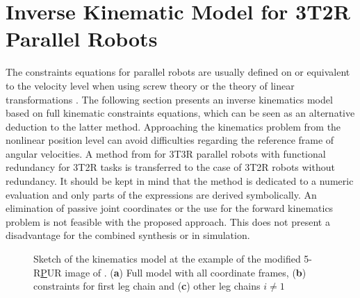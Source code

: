 \documentclass[
	graybox,
	vecphys] %
	{svmult}
\begin{document}
\vspace{-0.5cm}
\section{Inverse Kinematic Model for 3T2R Parallel Robots}
\label{sec:model}
\vspace{-0.2cm} %

The constraints equations for parallel robots are usually defined on or equivalent to the velocity level when using screw theory \cite{KongGos2007} or the theory of linear transformations \cite{Gogu2008}.
The following section presents an inverse kinematics model based on full kinematic constraints equations, which can be seen as an alternative deduction to the latter method.
Approaching the kinematics problem from the nonlinear position level can avoid difficulties regarding the reference frame of angular velocities.
A method from \cite{SchapplerTapOrt2019} for 3T3R parallel robots with functional redundancy for 3T2R tasks is transferred to the case of 3T2R robots without redundancy.
It should be kept in mind that the method is dedicated to a numeric evaluation and only parts of the expressions are derived symbolically.
An elimination of passive joint coordinates or the use for the forward kinematics problem is not feasible with the proposed approach.
This does not present a disadvantage for the combined synthesis or in simulation. 

\begin{figure}[tb]

\caption{Sketch of the kinematics model at the example of the modified 5-R\underline{P}UR image of \cite{MasoulehGos2011}. (\textbf{a}) Full model with all coordinate frames, (\textbf{b}) constraints for first leg chain and (\textbf{c}) other leg chains $i{\ne}1$}
\label{fig:kinematic_sketch}
\vspace{-0.1cm} %
\end{figure}
\end{document}
